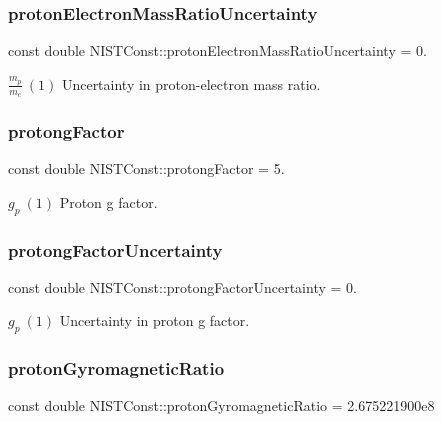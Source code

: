 \subsubsection{\texorpdfstring{proton\+Electron\+Mass\+Ratio\+Uncertainty}{protonElectronMassRatioUncertainty}}
{\footnotesize\ttfamily const double N\+I\+S\+T\+Const\+::proton\+Electron\+Mass\+Ratio\+Uncertainty = 0.}

$\frac{m_p}{m_e} \ (1)$ Uncertainty in proton-\/electron mass ratio. \mbox{\label{group___n_i_s_t_const-_proton_gafdc26fffabee1319028bd7f61d561be5}} 
\subsubsection{\texorpdfstring{protong\+Factor}{protongFactor}}
{\footnotesize\ttfamily const double N\+I\+S\+T\+Const\+::protong\+Factor = 5.}

$g_p \ (1)$ Proton g factor. \mbox{\label{group___n_i_s_t_const-_proton_ga0da65a4c99a5f1d339864c1f3e530a5b}} 
\subsubsection{\texorpdfstring{protong\+Factor\+Uncertainty}{protongFactorUncertainty}}
{\footnotesize\ttfamily const double N\+I\+S\+T\+Const\+::protong\+Factor\+Uncertainty = 0.}

$g_p \ (1)$ Uncertainty in proton g factor. \mbox{\label{group___n_i_s_t_const-_proton_ga5e708f58aaae8033705f05bc13507873}} 
\subsubsection{\texorpdfstring{proton\+Gyromagnetic\+Ratio}{protonGyromagneticRatio}}
{\footnotesize\ttfamily const double N\+I\+S\+T\+Const\+::proton\+Gyromagnetic\+Ratio = 2.\+675221900e8}

